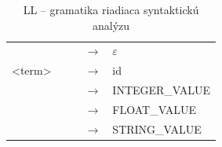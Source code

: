 \documentclass[a4paper, 11pt]{article}
\begin{document}
\begin{table}[!ht]
\begin{tabular}{lllll}
                                        &  &  & $\rightarrow$ & $\varepsilon$                                                                                                                    \\
\textless{}term\textgreater{}           &  &  & $\rightarrow$ & id                                                                                                                               \\
                                        &  &  & $\rightarrow$ & INTEGER\_VALUE                                                                                                                   \\
                                        &  &  & $\rightarrow$ & FLOAT\_VALUE                                                                                                                     \\
                                        &  &  & $\rightarrow$ & STRING\_VALUE                                                                                                                   
\end{tabular}
\caption{LL -- gramatika riadiaca syntaktickú analýzu}
\label{tabulka:LL_gram}
\end{table}

\newpage
\end{document}

